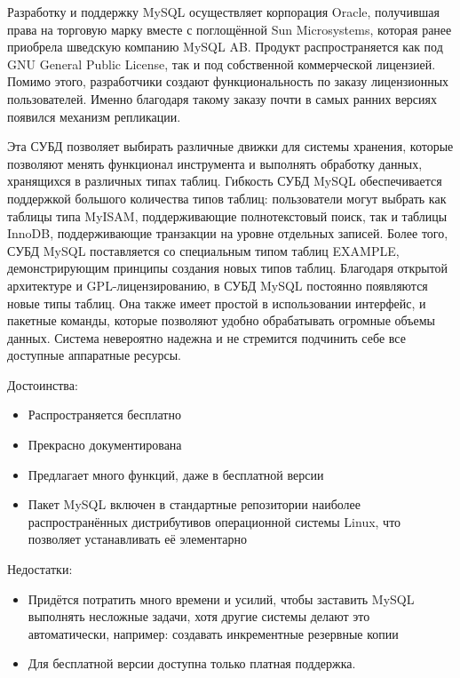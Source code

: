 Разработку и поддержку MySQL осуществляет корпорация Oracle, получившая права на торговую марку вместе с поглощённой Sun Microsystems, которая ранее приобрела шведскую компанию MySQL AB. Продукт распространяется как под GNU General Public License, так и под собственной коммерческой лицензией. Помимо этого, разработчики создают функциональность по заказу лицензионных пользователей. Именно благодаря такому заказу почти в самых ранних версиях появился механизм репликации.

Эта СУБД позволяет выбирать различные движки для системы хранения, которые позволяют менять функционал инструмента и выполнять обработку данных, хранящихся в различных типах таблиц. Гибкость СУБД MySQL обеспечивается поддержкой большого количества типов таблиц: пользователи могут выбрать как таблицы типа MyISAM, поддерживающие полнотекстовый поиск, так и таблицы InnoDB, поддерживающие транзакции на уровне отдельных записей. Более того, СУБД MySQL поставляется со специальным типом таблиц EXAMPLE, демонстрирующим принципы создания новых типов таблиц. Благодаря открытой архитектуре и GPL-лицензированию, в СУБД MySQL постоянно появляются новые типы таблиц. Она также имеет простой в использовании интерфейс, и пакетные команды, которые позволяют удобно обрабатывать огромные объемы данных. Система невероятно надежна и не стремится подчинить себе все доступные аппаратные ресурсы.

Достоинства:

\begin{itemize}
	\item Распространяется бесплатно
	\item 	Прекрасно документирована
	\item 	Предлагает много функций, даже в бесплатной версии
	\item 	Пакет MySQL включен в стандартные репозитории наиболее распространённых дистрибутивов операционной системы Linux, что позволяет устанавливать её элементарно
\end{itemize}

Недостатки:

\begin{itemize}
	\item Придётся потратить много времени и усилий, чтобы заставить MySQL выполнять несложные задачи, хотя другие системы делают это автоматически, например: создавать инкрементные резервные копии
	\item Для бесплатной версии доступна только платная поддержка.
\end{itemize}

